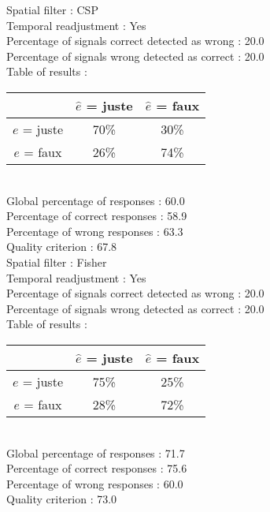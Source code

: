 Spatial filter : CSP \\
Temporal readjustment : Yes \\
Percentage of signals correct detected as wrong :   20.0 \\
Percentage of signals wrong detected as correct :   20.0 \\
Table of results : \\
\begin{tabular}{|c|c|c|}
\hline				& $\hat{e}$ = juste & $\hat{e}$ = faux \\
\hline  $e$ = juste	&     70\%			&     30\%		\\
\hline  $e$ = faux	&     26\%			&     74\%		\\
\hline
\end{tabular}\\
Global percentage of responses :   60.0 \\
Percentage of correct responses :   58.9 \\
Percentage of wrong responses :   63.3 \\
Quality criterion :   67.8 \\

Spatial filter : Fisher \\
Temporal readjustment : Yes \\
Percentage of signals correct detected as wrong :   20.0 \\
Percentage of signals wrong detected as correct :   20.0 \\
Table of results : \\
\begin{tabular}{|c|c|c|}
\hline				& $\hat{e}$ = juste & $\hat{e}$ = faux \\
\hline  $e$ = juste	&     75\%			&     25\%		\\
\hline  $e$ = faux	&     28\%			&     72\%		\\
\hline
\end{tabular}\\
Global percentage of responses :   71.7 \\
Percentage of correct responses :   75.6 \\
Percentage of wrong responses :   60.0 \\
Quality criterion :   73.0 \\


